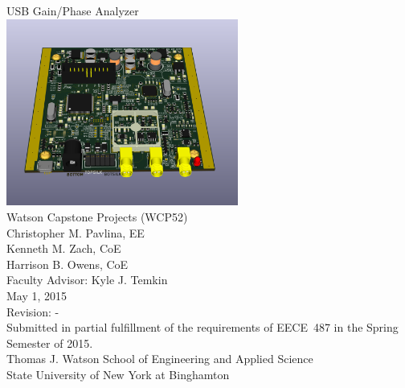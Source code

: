 \begin{titlingpage}
\begin{vplace}[0.5]
\begin{center}
{\Huge USB Gain/Phase Analyzer} \\
\includegraphics[width=3in]{full3d.png} \\
{\Huge Watson Capstone Projects (WCP52)} \\ \vspace{1cm}
{\Huge Christopher M. Pavlina, EE} \\
{\Huge Kenneth M. Zach, CoE} \\
{\Huge Harrison B. Owens, CoE} \\ \vspace{1cm}
{\Huge Faculty Advisor: Kyle J. Temkin} \\ \vspace{1cm}
{\Huge May 1, 2015} \\
{\Huge Revision: -} \\ \vspace{1cm}
{Submitted in partial fulfillment of the requirements of EECE~487 in the Spring Semester of 2015.} \\ \vspace{1cm}
{Thomas J. Watson School of Engineering and Applied Science} \\
{State University of New York at Binghamton} \\
\end{center}
\end{vplace}
\end{titlingpage}
